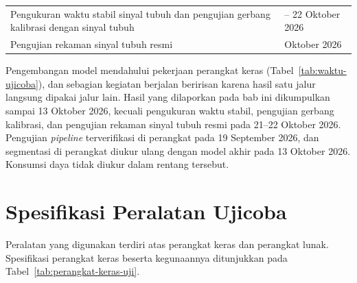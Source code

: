\begin{table}[!ht]
\begin{tabularx}{\linewidth}{>{\RaggedRight\arraybackslash}X>{\RaggedRight\arraybackslash}p{4.4cm}}
    Pengukuran waktu stabil sinyal tubuh dan pengujian gerbang kalibrasi dengan sinyal tubuh & 21 -- 22 Oktober 2026 \\
    Pengujian rekaman sinyal tubuh resmi & 22 Oktober 2026 \\
    \bottomrule
  \end{tabularx}
  \par\vspace{2pt}{\footnotesize\raggedright Keterangan: antarmuka perangkat mencakup layar, menu, dan perekaman berjeda. Kegiatan 13 Oktober 2026 memakai rangkaian uji dengan peta pin PCB.\par}
\end{table}

Pengembangan model mendahului pekerjaan perangkat keras (Tabel~\ref{tab:waktu-ujicoba}), dan sebagian kegiatan berjalan beririsan karena hasil satu jalur langsung dipakai jalur lain. Hasil yang dilaporkan pada bab ini dikumpulkan sampai 13 Oktober 2026, kecuali pengukuran waktu stabil, pengujian gerbang kalibrasi, dan pengujian rekaman sinyal tubuh resmi pada 21--22 Oktober 2026. Pengujian \textit{pipeline} terverifikasi di perangkat pada 19 September 2026, dan segmentasi di perangkat diukur ulang dengan model akhir pada 13 Oktober 2026. Konsumsi daya tidak diukur dalam rentang tersebut.


\section{Spesifikasi Peralatan Ujicoba}

Peralatan yang digunakan terdiri atas perangkat keras dan perangkat lunak. Spesifikasi perangkat keras beserta kegunaannya ditunjukkan pada Tabel~\ref{tab:perangkat-keras-uji}.


